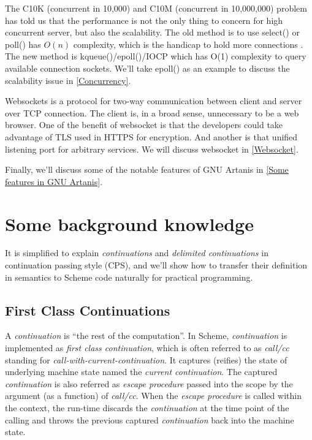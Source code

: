 \documentclass[numbers,numberedpars]{sigplanconf}
\begin{document}
The C10K (concurrent in 10,000) and C10M (concurrent in 10,000,000) problem has told us that the performance is not the only thing to concern
for high concurrent server, but also the scalability.  
The old method is to use select() or poll() has $O(n)$ complexity, which is the handicap to hold more connections \citep{lemon2001kqueue}.
The new method is kqueue()/epoll()/IOCP which has O(1) complexity to query available connection sockets. We'll take epoll() as an example to
discuss the scalability issue in \ref{Concurrency}.

Websockets is a protocol for two-way communication between client and server over TCP connection. The client is, in a broad sense,
unnecessary to be a web browser. One of the benefit of websocket is that the developers could take advantage of TLS used in HTTPS for
encryption. And another is that unified listening port for arbitrary services. We will discuss websocket in \ref{Websocket}.

Finally, we'll discuss some of the notable features of GNU Artanis in \ref{Some features in GNU Artanis}.

\section{Some background knowledge}

It is simplified to explain {\it continuations} and {\it delimited continuations} in continuation passing style (CPS), and we'll show how to
transfer their definition in semantics to Scheme code naturally for practical programming.

\subsection{First Class Continuations}

A {\it continuation} is ``the rest of the computation''. In Scheme, {\it continuation} is implemented as {\it first class continuation},
which is often referred to as {\it call/cc} standing for
{\it call-with-current-continuation}. It captures (reifies) the state of underlying machine state named the {\it current continuation}.
The captured {\it continuation} is also referred as {\it escape procedure} passed into the scope by the argument (as a function) of {\it call/cc}.
When the {\it escape procedure} is called within the context, the run-time discards the
{\it continuation} at the time point of the calling and throws the previous captured {\it continuation} back into the machine state.
\end{document}
